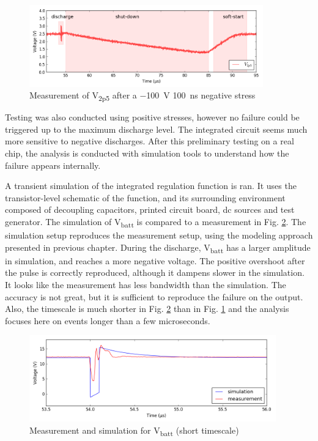 \begin{figure}[!h]
  \centering
  \includegraphics[width=0.9\textwidth]{src/3/figures/v2p5_measure.png}
  \caption{Measurement of V\textsubscript{2p5} after a \SI{-100}{\volt} \SI{100}{\nano\second} negative stress}
  \label{fig:meas-reset-v2p5}
\end{figure}

Testing was also conducted using positive stresses, however no failure could be triggered up to the maximum discharge level.
The integrated circuit seems much more sensitive to negative discharges.
After this preliminary testing on a real chip, the analysis is conducted with simulation tools to understand how the failure appears internally.

A transient simulation of the integrated regulation function is ran.
It uses the transistor-level schematic of the function, and its surrounding environment composed of decoupling capacitors, printed circuit board, \gls{dc} sources and test generator.
The simulation of V\textsubscript{batt} is compared to a measurement in Fig. \ref{fig:wvf-vbatt}.
The simulation setup reproduces the measurement setup, using the modeling approach presented in previous chapter.
During the discharge, V\textsubscript{batt} has a larger amplitude in simulation, and reaches a more negative voltage.
The positive overshoot after the pulse is correctly reproduced, although it dampens slower in the simulation.
It looks like the measurement has less bandwidth than the simulation.
The accuracy is not great, but it is sufficient to reproduce the failure on the output.
Also, the timescale is much shorter in Fig. \ref{fig:wvf-vbatt} than in Fig. \ref{fig:meas-reset-v2p5} and the analysis focuses here on events longer than a few microseconds.

\begin{figure}[!h]
  \centering
  \includegraphics[width=0.95\textwidth]{src/3/figures/vbatt.png}
  \caption{Measurement and simulation for V\textsubscript{batt} (short timescale)}
  \label{fig:wvf-vbatt}
\end{figure}

